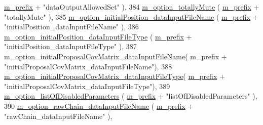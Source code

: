\begin{DoxyCode}
      \hyperlink{class_q_u_e_s_o_1_1_metropolis_hastings_s_g_options_a4f7c510aaa530336d24259e2a89f5d0b}{m\_prefix} + \textcolor{stringliteral}{"dataOutputAllowedSet"}                      ),
384   \hyperlink{class_q_u_e_s_o_1_1_metropolis_hastings_s_g_options_adc30bd8388e2da2b063671fc5ccad850}{m\_option\_totallyMute}                               (
      \hyperlink{class_q_u_e_s_o_1_1_metropolis_hastings_s_g_options_a4f7c510aaa530336d24259e2a89f5d0b}{m\_prefix} + \textcolor{stringliteral}{"totallyMute"}                               ),
385   \hyperlink{class_q_u_e_s_o_1_1_metropolis_hastings_s_g_options_a2dbb00eec372f529d21f770b0f220bd9}{m\_option\_initialPosition\_dataInputFileName}         (
      \hyperlink{class_q_u_e_s_o_1_1_metropolis_hastings_s_g_options_a4f7c510aaa530336d24259e2a89f5d0b}{m\_prefix} + \textcolor{stringliteral}{"initialPosition\_dataInputFileName"}         ),
386   \hyperlink{class_q_u_e_s_o_1_1_metropolis_hastings_s_g_options_ad997674bedeb76faf75773dc8c3dfd17}{m\_option\_initialPosition\_dataInputFileType}         (
      \hyperlink{class_q_u_e_s_o_1_1_metropolis_hastings_s_g_options_a4f7c510aaa530336d24259e2a89f5d0b}{m\_prefix} + \textcolor{stringliteral}{"initialPosition\_dataInputFileType"}         ),
387   \hyperlink{class_q_u_e_s_o_1_1_metropolis_hastings_s_g_options_a9d80faf22cf4d5614819ae5259463e89}{m\_option\_initialProposalCovMatrix\_dataInputFileName}(
      \hyperlink{class_q_u_e_s_o_1_1_metropolis_hastings_s_g_options_a4f7c510aaa530336d24259e2a89f5d0b}{m\_prefix} + \textcolor{stringliteral}{"initialProposalCovMatrix\_dataInputFileName"}),
388   \hyperlink{class_q_u_e_s_o_1_1_metropolis_hastings_s_g_options_a00116cfe535c1bea24a321f76c8c501a}{m\_option\_initialProposalCovMatrix\_dataInputFileType}(
      \hyperlink{class_q_u_e_s_o_1_1_metropolis_hastings_s_g_options_a4f7c510aaa530336d24259e2a89f5d0b}{m\_prefix} + \textcolor{stringliteral}{"initialProposalCovMatrix\_dataInputFileType"}),
389   \hyperlink{class_q_u_e_s_o_1_1_metropolis_hastings_s_g_options_ae3b9e124f89c653b2b2b09d97baa87ba}{m\_option\_listOfDisabledParameters}                  (
      \hyperlink{class_q_u_e_s_o_1_1_metropolis_hastings_s_g_options_a4f7c510aaa530336d24259e2a89f5d0b}{m\_prefix} + \textcolor{stringliteral}{"listOfDisabledParameters"}                  ),
390   \hyperlink{class_q_u_e_s_o_1_1_metropolis_hastings_s_g_options_a5527cd4da92ce0da6488df811ae5a0b0}{m\_option\_rawChain\_dataInputFileName}                (
      \hyperlink{class_q_u_e_s_o_1_1_metropolis_hastings_s_g_options_a4f7c510aaa530336d24259e2a89f5d0b}{m\_prefix} + \textcolor{stringliteral}{"rawChain\_dataInputFileName"}                ),

\end{DoxyCode}
